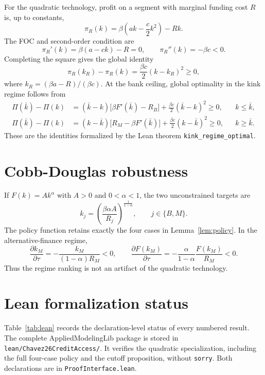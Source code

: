 \documentclass[11pt]{article}
\theoremstyle{definition}
\theoremstyle{remark}
\newcommand{\Rb}{R_B}
\newcommand{\Rm}{R_M}
\begin{document}
For the quadratic technology, profit on a segment with marginal funding cost
$R$ is, up to constants,
\begin{equation}
\pi_R(k)=\beta\left(ak-\frac c2k^2\right)-Rk.
\end{equation}
The FOC and second-order condition are
\begin{equation}
\pi_R'(k)=\beta(a-ck)-R=0,\qquad
\pi_R''(k)=-\beta c<0.
\end{equation}
Completing the square gives the global identity
\begin{equation}
\pi_R(k_R)-\pi_R(k)=\frac{\beta c}{2}(k-k_R)^2\ge0,
\end{equation}
where $k_R=(\beta a-R)/(\beta c)$. At the bank ceiling, global optimality in
the kink regime follows from
\begin{align}
\Pi(\bar k)-\Pi(k)
&=(\bar k-k)\bigl[\beta F'(\bar k)-\Rb\bigr]
+\frac{\beta c}{2}(\bar k-k)^2\ge0,
&&k\le\bar k,\\
\Pi(\bar k)-\Pi(k)
&=(k-\bar k)\bigl[\Rm-\beta F'(\bar k)\bigr]
+\frac{\beta c}{2}(k-\bar k)^2\ge0,
&&k\ge\bar k.
\end{align}
These are the identities formalized by the Lean theorem
\texttt{kink\_regime\_optimal}.

\section{Cobb-Douglas robustness}

If $F(k)=Ak^\alpha$ with $A>0$ and $0<\alpha<1$, the two unconstrained targets
are
\begin{equation}
k_j=\left(\frac{\beta\alpha A}{R_j}\right)^{\frac{1}{1-\alpha}},
\qquad j\in\{B,M\}.
\end{equation}
The policy function retains exactly the four cases in
Lemma~\ref{lem:policy}. In the alternative-finance regime,
\begin{equation}
\frac{\partial k_M}{\partial\tau}
=-\frac{k_M}{(1-\alpha)R_M}<0,
\qquad
\frac{\partial F(k_M)}{\partial\tau}
=-\frac{\alpha}{1-\alpha}\frac{F(k_M)}{R_M}<0.
\end{equation}
Thus the regime ranking is not an artifact of the quadratic technology.

\section{Lean formalization status}

Table~\ref{tab:lean} records the declaration-level status of every numbered
result. The complete Applied\-Modeling\-Lib package is stored in
\texttt{lean/Chavez26CreditAccess/}. It verifies the quadratic specialization,
including the full four-case policy and the cutoff proposition, without
\texttt{sorry}. Both declarations are in \texttt{ProofInterface.lean}.
\end{document}
